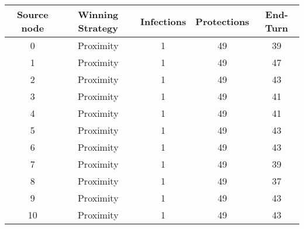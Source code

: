 \documentclass[results.tex]{subfiles}
\begin{document}
    \begin{center}
        \begin{tabular}{| c || c | c | c | c |}
            \hline
            {\bfseries Source node} & {\bfseries Winning Strategy} & {\bfseries Infections} & {\bfseries Protections}
            & {\bfseries End-Turn}
            \\  %
            \hline\hline
            0                       & Proximity                    & 1                      & 49                      & 39                   \\
            \hline
            1                       & Proximity                    & 1                      & 49                      & 47                   \\
            \hline
            2                       & Proximity                    & 1                      & 49                      & 43                   \\
            \hline
            3                       & Proximity                    & 1                      & 49                      & 41                   \\
            \hline
            4                       & Proximity                    & 1                      & 49                      & 41                   \\
            \hline
            5                       & Proximity                    & 1                      & 49                      & 43                   \\
            \hline
            6                       & Proximity                    & 1                      & 49                      & 43                   \\
            \hline
            7                       & Proximity                    & 1                      & 49                      & 39                   \\
            \hline
            8                       & Proximity                    & 1                      & 49                      & 37                   \\
            \hline
            9                       & Proximity                    & 1                      & 49                      & 43                   \\
            \hline
            10                      & Proximity                    & 1                      & 49                      & 43                   \\

\end{tabular}
\end{center}
\end{document}
